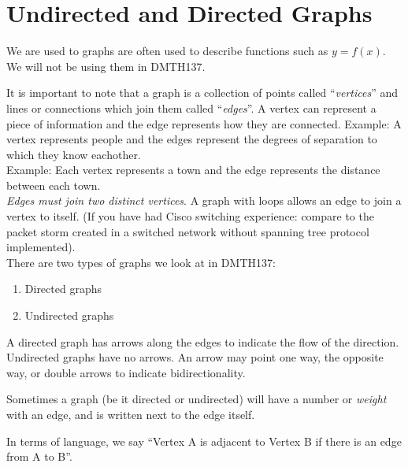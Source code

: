 \chapter{Undirected and Directed Graphs}
\label{chap:UndirectedAndDirectedGraphs}
We are used to graphs are often used to describe functions such as $y = f(x)$.
We will not be using them in DMTH137.

It is important to note that a graph is a collection of points called
``\emph{vertices}'' and lines or connections which join them called
``\emph{edges}''.
A vertex can represent a piece of information and the edge represents how they
are connected.
Example: A vertex represents people and the edges represent the degrees of
separation to which they know eachother.
\\
Example: Each vertex represents a town and the edge represents the distance
between each town.
\\
\emph{Edges must join two distinct vertices}. A graph with loops allows an edge
to join a vertex to itself. (If you have had Cisco switching experience: compare to the
packet storm created in a switched network without spanning tree protocol
implemented).
\\
There are two types of graphs we look at in DMTH137:
\begin{enumerate}
  \item Directed graphs
  \item Undirected graphs
\end{enumerate}

A directed graph has arrows along the edges to indicate the flow of the
direction. Undirected graphs have no arrows. An arrow may point one way, the
opposite way, or double arrows to indicate bidirectionality.



Sometimes a graph (be it directed or undirected) will have a number or
\emph{weight} with an edge, and is written next to the edge itself.


In terms of language, we say ``Vertex A is adjacent to Vertex B if there is an
edge from A to B''.

